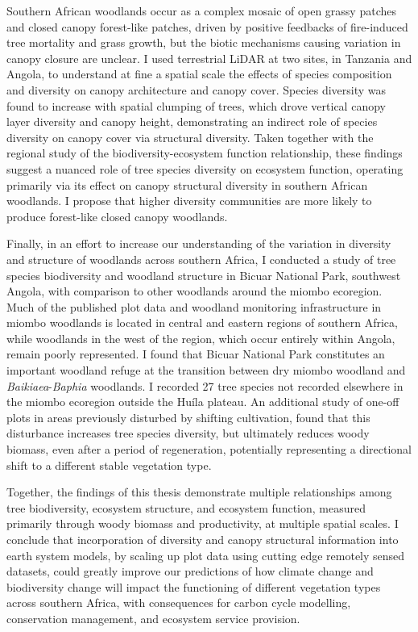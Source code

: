 Southern African woodlands occur as a complex mosaic of open grassy patches and closed canopy forest-like patches, driven by positive feedbacks of fire-induced tree mortality and grass growth, but the biotic mechanisms causing variation in canopy closure are unclear. I used terrestrial LiDAR at two sites, in Tanzania and Angola, to understand at fine a spatial scale the effects of species composition and diversity on canopy architecture and canopy cover. Species diversity was found to increase with spatial clumping of trees, which drove vertical canopy layer diversity and canopy height, demonstrating an indirect role of species diversity on canopy cover via structural diversity. Taken together with the regional study of the biodiversity-ecosystem function relationship, these findings suggest a nuanced role of tree species diversity on ecosystem function, operating primarily via its effect on canopy structural diversity in southern African woodlands. I propose that higher diversity communities are more likely to produce forest-like closed canopy woodlands.

Finally, in an effort to increase our understanding of the variation in diversity and structure of woodlands across southern Africa, I conducted a study of tree species biodiversity and woodland structure in Bicuar National Park, southwest Angola, with comparison to other woodlands around the miombo ecoregion. Much of the published plot data and woodland monitoring infrastructure in miombo woodlands is located in central and eastern regions of southern Africa, while woodlands in the west of the region, which occur entirely within Angola, remain poorly represented. I found that Bicuar National Park constitutes an important woodland refuge at the transition between dry miombo woodland and \textit{Baikiaea}-\textit{Baphia} woodlands. I recorded 27 tree species not recorded elsewhere in the miombo ecoregion outside the Hu\'{i}la plateau. An additional study of one-off plots in areas previously disturbed by shifting cultivation, found that this disturbance increases tree species diversity, but ultimately reduces woody biomass, even after a period of regeneration, potentially representing a directional shift to a different stable vegetation type.

Together, the findings of this thesis demonstrate multiple relationships among tree biodiversity, ecosystem structure, and ecosystem function, measured primarily through woody biomass and productivity, at multiple spatial scales. I conclude that incorporation of diversity and canopy structural information into earth system models, by scaling up plot data using cutting edge remotely sensed datasets, could greatly improve our predictions of how climate change and biodiversity change will impact the functioning of different vegetation types across southern Africa, with consequences for carbon cycle modelling, conservation management, and ecosystem service provision. 

